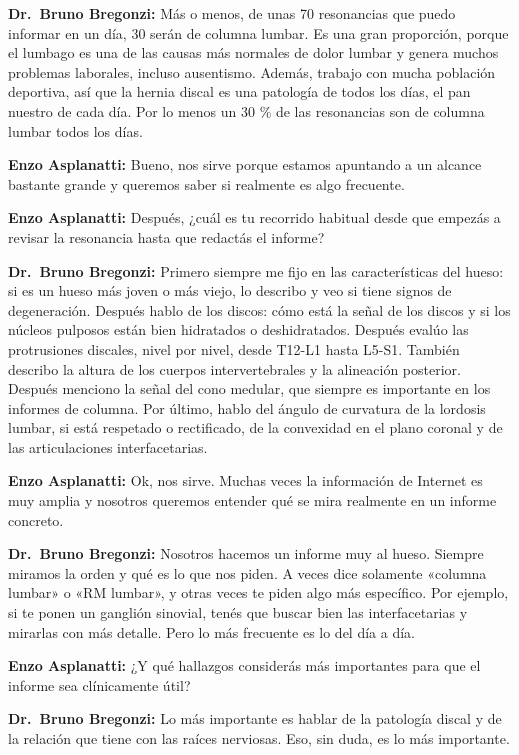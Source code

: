 \noindent\textbf{Dr.~Bruno Bregonzi:} Más o menos, de unas 70 resonancias que puedo informar en un día, 30 serán de columna lumbar. Es una gran proporción, porque el lumbago es una de las causas más normales de dolor lumbar y genera muchos problemas laborales, incluso ausentismo. Además, trabajo con mucha población deportiva, así que la hernia discal es una patología de todos los días, el pan nuestro de cada día. Por lo menos un 30 \% de las resonancias son de columna lumbar todos los días.

\noindent\textbf{Enzo Asplanatti:} Bueno, nos sirve porque estamos apuntando a un alcance bastante grande y queremos saber si realmente es algo frecuente.

\noindent\textbf{Enzo Asplanatti:} Después, ¿cuál es tu recorrido habitual desde que empezás a revisar la resonancia hasta que redactás el informe?

\noindent\textbf{Dr.~Bruno Bregonzi:} Primero siempre me fijo en las características del hueso: si es un hueso más joven o más viejo, lo describo y veo si tiene signos de degeneración. Después hablo de los discos: cómo está la señal de los discos y si los núcleos pulposos están bien hidratados o deshidratados. Después evalúo las protrusiones discales, nivel por nivel, desde T12-L1 hasta L5-S1. También describo la altura de los cuerpos intervertebrales y la alineación posterior. Después menciono la señal del cono medular, que siempre es importante en los informes de columna. Por último, hablo del ángulo de curvatura de la lordosis lumbar, si está respetado o rectificado, de la convexidad en el plano coronal y de las articulaciones interfacetarias.

\noindent\textbf{Enzo Asplanatti:} Ok, nos sirve. Muchas veces la información de Internet es muy amplia y nosotros queremos entender qué se mira realmente en un informe concreto.

\noindent\textbf{Dr.~Bruno Bregonzi:} Nosotros hacemos un informe muy al hueso. Siempre miramos la orden y qué es lo que nos piden. A veces dice solamente «columna lumbar» o «RM lumbar», y otras veces te piden algo más específico. Por ejemplo, si te ponen un ganglión sinovial, tenés que buscar bien las interfacetarias y mirarlas con más detalle. Pero lo más frecuente es lo del día a día.

\noindent\textbf{Enzo Asplanatti:} ¿Y qué hallazgos considerás más importantes para que el informe sea clínicamente útil?

\noindent\textbf{Dr.~Bruno Bregonzi:} Lo más importante es hablar de la patología discal y de la relación que tiene con las raíces nerviosas. Eso, sin duda, es lo más importante.

